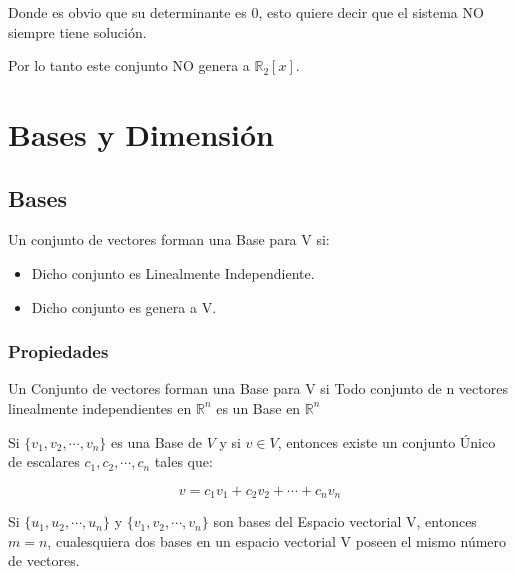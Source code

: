 \documentclass[12pt]{report}							    %
\begin{document}
            Donde es obvio que su determinante es 0, esto quiere decir que el
            sistema NO siempre tiene solución.

            Por lo tanto este conjunto NO genera a $\mathbb{R}_2 [x]$.


    \clearpage
    \section{Bases y Dimensión}

        \subsection{Bases}
        Un conjunto de vectores forman una Base para V si:
        \begin{itemize}
            \item Dicho conjunto es Linealmente Independiente.

            \item Dicho conjunto es genera a V.
        \end{itemize}

        \subsubsection{Propiedades}
        Un Conjunto de vectores forman una Base para V si Todo conjunto de n vectores
        linealmente independientes en $\mathbb{R}^n$ es un Base en $\mathbb{R}^n$

        Si $\{ v_1, v_2,\cdots, v_n\}$ es una Base de $V$ y si $v \in V$, entonces
        existe un conjunto Único de escalares $c_1, c_2, \cdots, c_n$ tales que:

        \begin{equation}
            v = c_1v_1 + c_2v_2 + \cdots + c_nv_n
        \end{equation}

        Si $\{u_1, u_2, \cdots, u_n\}$ y $\{v_1, v_2, \cdots, v_n\}$ son bases del
        Espacio vectorial V, entonces $m = n$, cualesquiera dos bases en un espacio
        vectorial V poseen el mismo número de vectores.

\end{document}
